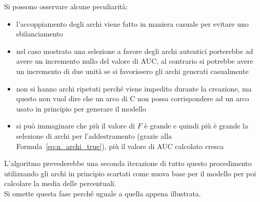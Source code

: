 Si possono osservare alcune peculiarità:
\begin{itemize}
	\item l'accoppiamento degli archi viene fatto in maniera casuale per evitare uno sbilanciamento
	\item nel caso mostrato una selezione a favore degli archi autentici porterebbe ad avere un incremento nullo del valore di AUC, al contrario si potrebbe avere un incremento di due unità se si favorissero  gli archi generati casualmente
	\item non si hanno archi ripetuti perché viene impedito durante la creazione, ma questo non vuol dire che un arco di C non possa corrispondere ad un arco usato in principio per generare il modello
	\item si può immaginare che più il valore di $F$ è grande e quindi più è grande la selezione di archi per l'addestramento (grazie alla Formula~\ref{eq:n_archi_true}), più il valore di AUC calcolato cresca
\end{itemize}
L'algoritmo prevederebbe una seconda iterazione di tutto questo procedimento utilizzando gli archi in principio scartati come nuova base per il modello per poi calcolare la media delle percentuali.\\
Si omette questa fase perché uguale a quella appena illustrata.
%
